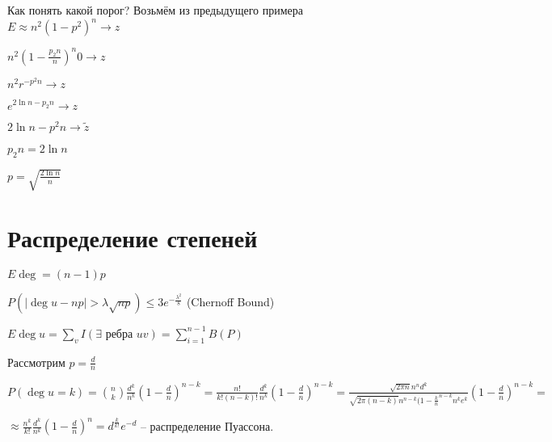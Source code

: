 \documentclass{book}
\theoremstyle{definition}
\newcommand{\tl}[1]{\widetilde{#1}}
\begin{document}
Как понять какой порог? Возьмём из предыдущего примера $E \approx n^2(1-p^2)^n \to z$

$n^2\left( 1 - \frac{p_2n}{n} \right) ^n 0\to z$

$n^2r^{-p^2n} \to z$

$e^{2\ln n - p_2n} \to z$

$2\ln n - p^2n \to \tl z$

$p_2n = 2\ln  n$

$p = \sqrt{\frac{2\ln n}{n}} $



\section{Распределение степеней}

$E\deg = (n-1)p$

 \begin{theorem}
     $P\left( \left| \deg u - np \right| >\lambda \sqrt{np}  \right) \leqslant 3 e^{-\frac{\lambda^2}{8}}$ (Chernoff Bound)

     $E \deg u = \sum_v I\left( \exists \text{ ребра }uv \right)  = \sum_{i=1}^{n-1} B(P)$
\end{theorem}

Рассмотрим $p = \frac{d}{n}$ 

$P(\deg u = k) = {n\choose k}\frac{d^k}{n^k}\left( 1 - \frac{d}{n} \right) ^{n-k} = \frac{n!}{k!(n-k)!} \frac{d^k}{n^k}\left( 1 - \frac{d}{n} \right) ^{n-k} = \frac{\sqrt{2\pi n} n^nd^k}{ \sqrt{2\pi (n-k)} n^{n-k}(1 - \frac{k}{n}^{n-k}n^k e^k}\left( 1 - \frac{d}{n} \right) ^{n-k} = $

$\approx \frac{n^k}{k!}\frac{d^k}{n^k}\left( 1 - \frac{d}{n} \right) ^n = d^\frac{k}{k!}e^{-d}$ -- распределение Пуассона.
\end{document}
